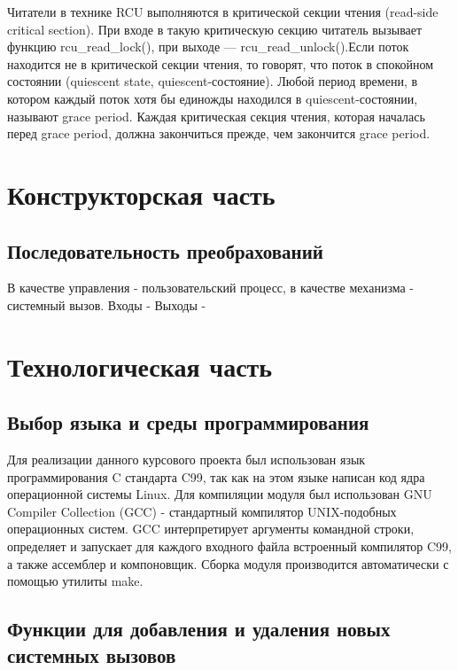 \documentclass{bmstu}
\begin{document}
Читатели в технике RCU выполняются в критической секции чтения (read-side critical section). При входе в такую критическую секцию читатель вызывает функцию rcu\_read\_lock(), при выходе — rcu\_read\_unlock().Если поток находится не в критической секции чтения, то говорят, что поток в спокойном состоянии (quiescent state, quiescent-состояние). Любой период времени, в котором каждый поток хотя бы единожды находился в quiescent-состоянии, называют grace period. Каждая критическая секция чтения, которая началась перед grace period, должна закончиться прежде, чем закончится grace period.


\chapter{Конструкторская часть}
\section{Последовательность преобрахований}
В качестве управления - пользовательский процесс, в качестве механизма - системный вызов.
Входы - %
Выходы - %


\chapter{Технологическая часть}
\section{Выбор языка и среды программирования}
Для реализации данного курсового проекта был использован язык программирования C стандарта C99, так как на этом языке написан код ядра операционной системы Linux. Для компиляции модуля был использован GNU Compiler Collection (GCC) - стандартный компилятор UNIX-подобных операционных систем. GCC интерпретирует аргументы командной строки, определяет и запускает для каждого входного файла встроенный компилятор C99, а также ассемблер и компоновщик.
Сборка модуля производится автоматически с помощью утилиты make.

\section{Функции для добавления и удаления новых системных вызовов}%
\end{document}
